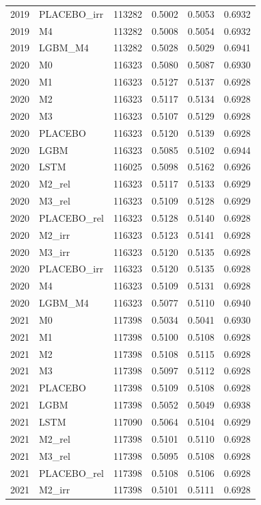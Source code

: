 \begin{tabular}{llrrrr}
2019 & PLACEBO\_irr & 113282 & 0.5002 & 0.5053 & 0.6932 \\
2019 & M4 & 113282 & 0.5008 & 0.5054 & 0.6932 \\
2019 & LGBM\_M4 & 113282 & 0.5028 & 0.5029 & 0.6941 \\
2020 & M0 & 116323 & 0.5080 & 0.5087 & 0.6930 \\
2020 & M1 & 116323 & 0.5127 & 0.5137 & 0.6928 \\
2020 & M2 & 116323 & 0.5117 & 0.5134 & 0.6928 \\
2020 & M3 & 116323 & 0.5107 & 0.5129 & 0.6928 \\
2020 & PLACEBO & 116323 & 0.5120 & 0.5139 & 0.6928 \\
2020 & LGBM & 116323 & 0.5085 & 0.5102 & 0.6944 \\
2020 & LSTM & 116025 & 0.5098 & 0.5162 & 0.6926 \\
2020 & M2\_rel & 116323 & 0.5117 & 0.5133 & 0.6929 \\
2020 & M3\_rel & 116323 & 0.5109 & 0.5128 & 0.6929 \\
2020 & PLACEBO\_rel & 116323 & 0.5128 & 0.5140 & 0.6928 \\
2020 & M2\_irr & 116323 & 0.5123 & 0.5141 & 0.6928 \\
2020 & M3\_irr & 116323 & 0.5120 & 0.5135 & 0.6928 \\
2020 & PLACEBO\_irr & 116323 & 0.5120 & 0.5135 & 0.6928 \\
2020 & M4 & 116323 & 0.5109 & 0.5131 & 0.6928 \\
2020 & LGBM\_M4 & 116323 & 0.5077 & 0.5110 & 0.6940 \\
2021 & M0 & 117398 & 0.5034 & 0.5041 & 0.6930 \\
2021 & M1 & 117398 & 0.5100 & 0.5108 & 0.6928 \\
2021 & M2 & 117398 & 0.5108 & 0.5115 & 0.6928 \\
2021 & M3 & 117398 & 0.5097 & 0.5112 & 0.6928 \\
2021 & PLACEBO & 117398 & 0.5109 & 0.5108 & 0.6928 \\
2021 & LGBM & 117398 & 0.5052 & 0.5049 & 0.6938 \\
2021 & LSTM & 117090 & 0.5064 & 0.5104 & 0.6929 \\
2021 & M2\_rel & 117398 & 0.5101 & 0.5110 & 0.6928 \\
2021 & M3\_rel & 117398 & 0.5095 & 0.5108 & 0.6928 \\
2021 & PLACEBO\_rel & 117398 & 0.5108 & 0.5106 & 0.6928 \\
2021 & M2\_irr & 117398 & 0.5101 & 0.5111 & 0.6928 \\

\end{tabular}
